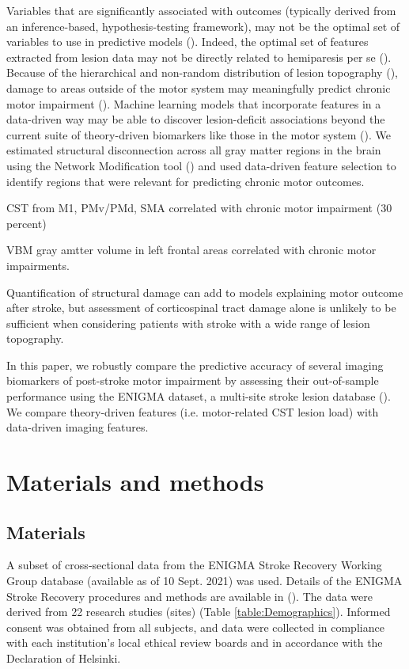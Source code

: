 \documentclass[10pt]{article}
\begin{document}
Variables that are significantly associated with outcomes (typically derived from an inference-based, hypothesis-testing framework), may not be the optimal set of variables to use in predictive models (\cite{Bzdok2020-py}). Indeed, the optimal set of features extracted from lesion data may not be directly related to hemiparesis per se (\cite{Sperber2021-lw}). Because of the hierarchical and non-random distribution of lesion topography (\cite{Mah2014-cb,Wang2019-dz}), damage to areas outside of the motor system may meaningfully predict chronic motor impairment (\cite{Sperber2021-lw}). Machine learning models that incorporate features in a data-driven way may be able to discover lesion-deficit associations beyond the current suite of theory-driven biomarkers like those in the motor system (\cite{Kasties2021-rm, Calesella2021-kp}). We estimated structural disconnection across all gray matter regions in the brain using the Network Modification tool (\cite{Kuceyeski2013-nk}) and used data-driven feature selection to identify regions that were relevant for predicting chronic motor outcomes. 

\cite{Kou2013-kv} CST from M1, PMv/PMd, SMA correlated with chronic motor impairment (30 percent)

\cite{Gauthier2012-za} VBM gray amtter volume in left frontal areas correlated with chronic motor impairments.


\cite{Park2016-te} Quantification of structural damage can add to models explaining motor outcome after stroke, but assessment of corticospinal tract damage alone is unlikely to be sufficient when considering patients with stroke with a wide range of lesion topography.



In this paper, we robustly compare the predictive accuracy of several imaging biomarkers of post-stroke motor impairment by assessing their out-of-sample performance using the ENIGMA dataset, a multi-site stroke lesion database (\cite{Liew2020-ps}). We compare theory-driven features (i.e. motor-related CST lesion load) with data-driven imaging features. 


\section{Materials and methods}
\subsection{Materials}
A subset of cross‐sectional data from the ENIGMA Stroke Recovery Working Group database (available as of 10 Sept. 2021) was used. Details of the ENIGMA Stroke Recovery procedures and methods are available in (\cite{Liew2020-ps}). The data were derived from 22 research studies (sites) (Table \ref{table:Demographics}). Informed consent was obtained from all subjects, and data were collected in compliance with each institution’s local ethical review boards and in accordance with the Declaration of Helsinki.
\end{document}
